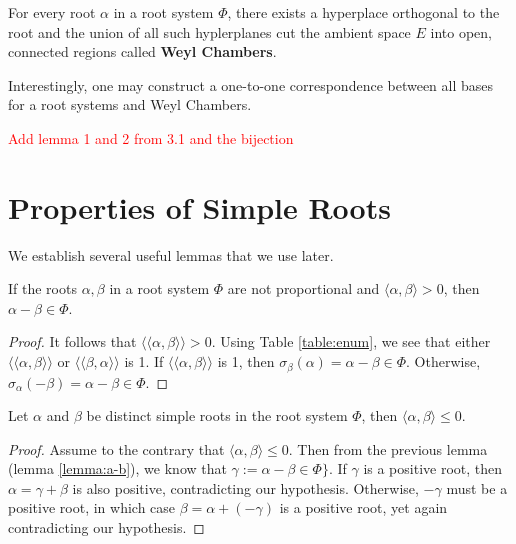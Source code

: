 For every root $\alpha$ in a root system $\Phi$, there exists a hyperplace orthogonal to the root
and the union of all such hyplerplanes cut the ambient space $E$ into open, connected regions
called \textbf{Weyl Chambers}. \newline

Interestingly, one may construct a one-to-one correspondence between all bases
for a root systems and Weyl Chambers.

\textcolor{red}{Add lemma 1 and 2 from 3.1 and the bijection}


\section{Properties of Simple Roots}

We establish several useful lemmas that we use later.

\begin{lemma}
    \label{lemma:a-b}
    If the roots $\alpha, \beta$ in a root system $\Phi$ are not proportional and
    $\langle \alpha, \beta \rangle > 0$, then $\alpha - \beta \in \Phi$.
\end{lemma}

\begin{proof}
    It follows that $\langle \langle \alpha, \beta \rangle \rangle > 0$.
    Using Table \ref{table:enum}, we see that either $\langle \langle \alpha, \beta \rangle \rangle$ or 
    $\langle \langle \beta, \alpha \rangle \rangle$ is 1.
    If $\langle \langle \alpha, \beta \rangle \rangle$ is 1,
    then $\sigma_{\beta}(\alpha) = \alpha - \beta \in \Phi$.
    Otherwise, $\sigma_{\alpha}(-\beta) = \alpha - \beta \in \Phi$.
\end{proof}

\begin{lemma}
    \label{lemma:a.b_leq_0}
    Let $\alpha$ and $\beta$ be distinct simple roots in the root system $\Phi$,
    then $\langle \alpha, \beta \rangle \leq 0$.
\end{lemma}

\begin{proof}
    Assume to the contrary that $\langle \alpha, \beta \rangle \leq 0$.
    Then from the previous lemma (lemma \ref{lemma:a-b}),
    we know that $\gamma := \alpha - \beta \in \Phi\}$.
    If $\gamma$ is a positive root, then $\alpha = \gamma + \beta$ is also positive,
    contradicting our hypothesis. Otherwise, $-\gamma$ must be a positive root, in which case
    $\beta = \alpha + (-\gamma)$ is a positive root, yet again contradicting our hypothesis.
\end{proof}

